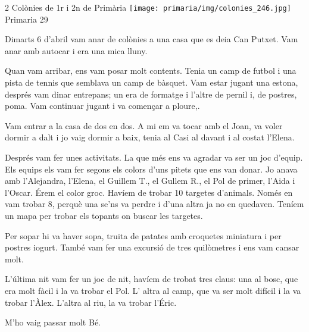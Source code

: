 \begin{news}
{2} %
{Colònies de 1r i 2n de Primària}
{\noindent\texttt{[image: primaria/img/colonies\_246.jpg]}}
{Primaria}
{29} %

Dimarts 6 d’abril vam anar de colònies a una casa que es deia Can Putxet. Vam anar amb autocar  i era una mica lluny.

Quan vam arribar,  ens vam posar molt contents. Tenia un camp de futbol i una pista de tennis que semblava un camp de bàsquet. Vam estar jugant una estona, després vam dinar entrepans; un era de formatge i l’altre de pernil i, de postres, poma. Vam continuar jugant i va començar a ploure,. 

Vam entrar a la casa de dos en dos. A mi em va tocar amb el Joan, va voler dormir a dalt i jo vaig dormir a baix, tenia al Casi al davant i al costat l’Elena.


Després vam fer unes activitats. La que més ens va agradar  va ser un joc d’equip. Els equips els vam fer segons els colors d’uns pitets  que ens van donar. Jo anava amb l’Alejandra, l’Elena, el Guillem T., el Gullem R., el Pol de primer, l’Aida i l’Oscar. Érem el color groc. Havíem de trobar 10 targetes d’animals. Només en vam trobar 8, perquè una se’ns va perdre i d’una altra ja  no en quedaven. Teníem un mapa per trobar els topants on buscar les targetes.

Per sopar hi  va haver sopa, truita de patates amb croquetes miniatura i per  postres iogurt. També vam fer una excursió de tres quilòmetres i ens vam cansar molt.

L’última nit vam fer un joc de nit, havíem de trobat tres claus: una al bosc, que era molt fàcil i la va trobar el Pol. L’ altra al camp, que va ser molt difícil i la va trobar l’Àlex. L’altra al riu, la va trobar l’Éric.

M’ho vaig passar molt Bé.


\end{news}


